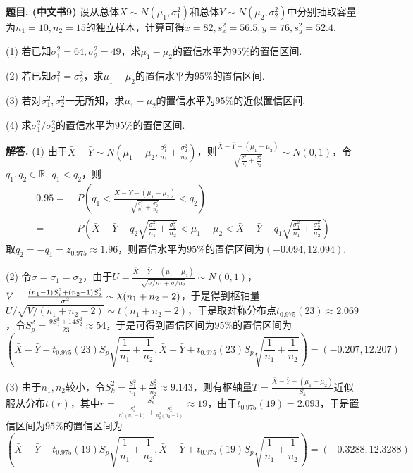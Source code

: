 \documentclass[12pt, a4paper, oneside]{ctexart}
\newcounter{problem}  %
\newenvironment{problem}[1][]{\stepcounter{problem}\par\noindent\textbf{题目\arabic{problem}. #1}}{\smallskip\par}
\newenvironment{solution}[1][]{\par\noindent\textbf{#1解答. }}{\smallskip\par}  %
\DeclareRobustCommand{\rchi}{{\mathpalette\irchi\relax}}
\newcommand{\irchi}[2]{\raisebox{\depth}{$#1\chi$}} %
\def\R{\mathbb{R}}          %
\def\add{\vspace{1ex}}      %
\begin{document}
\begin{problem}[(中文书9)]
    设从总体$X\sim N(\mu_1,\sigma_1^2)$和总体$Y\sim N(\mu_2,\sigma_2^2)$中分别抽取容量为$n_1=10, n_2=15$的独立样本，计算可得$\bar{x} = 82, s_x^2 = 56.5, \bar{y} = 76, s_y^2 = 52.4$.

    (1) 若已知$\sigma_1^2=64,\sigma_2^2=49$，求$\mu_1-\mu_2$的置信水平为$95\%$的置信区间.

    (2) 若已知$\sigma_1^2=\sigma_2^2$，求$\mu_1-\mu_2$的置信水平为$95\%$的置信区间.

    (3) 若对$\sigma_1^2,\sigma_2^2$一无所知，求$\mu_1-\mu_2$的置信水平为$95\%$的近似置信区间.

    (4) 求$\sigma_1^2/\sigma_2^2$的置信水平为$95\%$的置信区间.
\end{problem}
\begin{solution}
    (1) 由于$\bar{X}-\bar{Y}\sim N(\mu_1-\mu_2, \frac{\sigma_1^2}{n_1}+\frac{\sigma_2^2}{n_2})$，则$\frac{\bar{X}-\bar{Y}-(\mu_1-\mu_2)}{\sqrt{\frac{\sigma_1^2}{n_1}+\frac{\sigma_2^2}{n_2}}}\sim N(0,1)$，令$q_1,q_2\in\R,\ q_1<q_2$，则
    \begin{align*}
        0.95 =&\ P\left(q_1 < \frac{\bar{X}-\bar{Y}-(\mu_1-\mu_2)}{\sqrt{\frac{\sigma_1^2}{n_1}+\frac{\sigma_2^2}{n_2}}} < q_2\right)\\
        =&\ P\left(\bar{X}-\bar{Y} - q_2\sqrt{\frac{\sigma_1^2}{n_1}+\frac{\sigma_2^2}{n_2}}<\mu_1-\mu_2<\bar{X}-\bar{Y}-q_1\sqrt{\frac{\sigma_1^2}{n_1}+\frac{\sigma_2^2}{n_2}}\right)
    \end{align*}
    取$q_2 = -q_1 = z_{0.975} \approx 1.96$，则置信水平为$95\%$的置信区间为$(-0.094, 12.094)$.\add

    (2) 令$\sigma=\sigma_1=\sigma_2$，\add 由于$U = \frac{\bar{X} - \bar{Y} - (\mu_1-\mu_2)}{\sqrt{\sigma/n_1+\sigma/n_2}}\sim N(0,1)$，$V = \frac{(n_1-1)S_1^2+(n_2-1)S_2^2}{\sigma^2}\sim \rchi(n_1+n_2-2)$，\add 于是得到枢轴量$U/\sqrt{V/(n_1+n_2-2)}\sim t(n_1+n_2-2)$，于是取对称分布点$t_{0.975}(23)\approx 2.069$，令$S_p^2 = \frac{9S_1^2+14S_2^2}{23}\approx 54$，于是可得到置信区间为$95\%$的置信区间为
    \begin{equation*}
        \left(\bar{X}-\bar{Y}-t_{0.975}(23)S_p\sqrt{\frac{1}{n_1}+\frac{1}{n_2}}, \bar{X}-\bar{Y}+t_{0.975}(23)S_p\sqrt{\frac{1}{n_1}+\frac{1}{n_2}}\right) = (-0.207, 12.207)
    \end{equation*}

    (3) 由于$n_1,n_2$较小，令$S_k^2 = \frac{S_1^2}{n_1}+\frac{S_2^2}{n_2} \approx 9.143$，则有枢轴量$T = \frac{\bar{X}-\bar{Y} - (\mu_1-\mu_2)}{S_k}$近似服从分布$t(r)$，其中$r = \frac{S_k^4}{\frac{S_1^4}{n_1^2(n_1-1)}+\frac{S_2^4}{n_2^2(n_2-1)}}\approx 19$，由于$t_{0.975}(19) = 2.093$，于是置信区间为$95\%$的置信区间为
    \begin{equation*}
        (\bar{X}-\bar{Y}-t_{0.975}(19)S_p\sqrt{\frac{1}{n_1}+\frac{1}{n_2}},\bar{X}-\bar{Y}+t_{0.975}(19)S_p\sqrt{\frac{1}{n_1}+\frac{1}{n_2}}) = (-0.3288, 12.3288)
    \end{equation*}


\end{solution}
\end{document}
